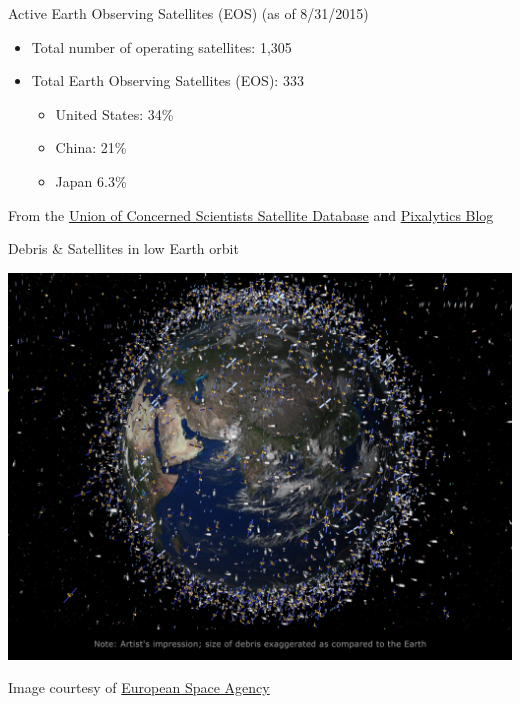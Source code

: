 \documentclass[ignorenonframetext,]{beamer}
\begin{document}
\begin{frame}{Active Earth Observing Satellites (EOS) (as of 8/31/2015)}

\begin{itemize}
\itemsep1pt\parskip0pt
\item
  Total number of operating satellites: 1,305
\item
  Total Earth Observing Satellites (EOS): 333

  \begin{itemize}
  \itemsep1pt\parskip0pt
  \item
    United States: 34\%
  \item
    China: 21\%\\
  \item
    Japan 6.3\%
  \end{itemize}
\end{itemize}

From the
\href{http://www.ucsusa.org/nuclear-weapons/space-weapons/satellite-database.html\#.VjzlnoS98VQ}{Union
of Concerned Scientists Satellite Database} and
\href{http://www.pixalytics.com/blog/}{Pixalytics Blog}

\end{frame}

\begin{frame}{Debris \& Satellites in low Earth orbit}

\includegraphics{assets/satellites.jpg}

Image courtesy of
\href{http://www.esa.int/spaceinimages/Images/2008/03/Debris_objects_-_mostly_debris_-_in_low_Earth_orbit_LEO_-_view_over_the_equator}{European
Space Agency}

\end{frame}
\end{document}
